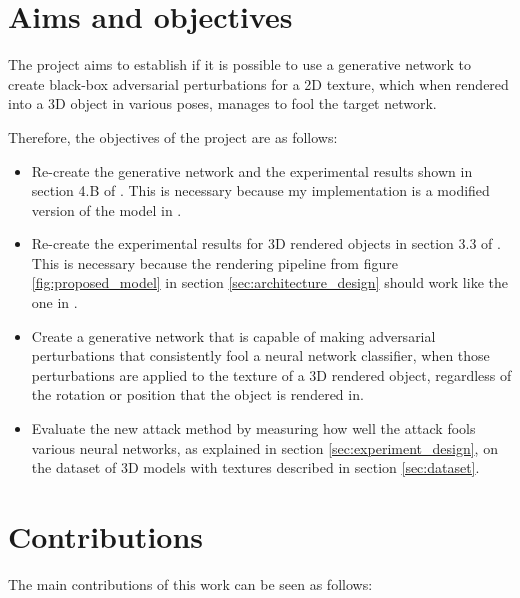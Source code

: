 \section{Aims and objectives}
    \label{sec:aims_objectives}

The project aims to establish if it is possible to use a generative network to create black-box adversarial perturbations for a 2D texture, which when rendered into a 3D object in various poses, manages to fool the target network. 

Therefore, the objectives of the project are as follows:

\begin{itemize}
    \item Re-create the generative network and the experimental results shown in section 4.B of \cite{zheng_black_box_GAN}. This is necessary because my implementation is a modified version of the model in \cite{zheng_black_box_GAN}.
    \item Re-create the experimental results for 3D rendered objects in section 3.3 of \cite{athalye}. This is necessary because the rendering pipeline from figure \ref{fig:proposed_model} in section \ref{sec:architecture_design} should work like the one in \cite{athalye}.
    \item Create a generative network that is capable of making adversarial perturbations that consistently fool a neural network classifier, when those perturbations are applied to the texture of a 3D rendered object, regardless of the rotation or position that the object is rendered in.
    \item Evaluate the new attack method by measuring how well the attack fools various neural networks, as explained in section \ref{sec:experiment_design}, on the dataset of 3D models with textures described in section \ref{sec:dataset}.
\end{itemize}

\section{Contributions} 
	\label{sec:intro_contribs} 
	
	The main contributions of this work can be seen as follows:
	
